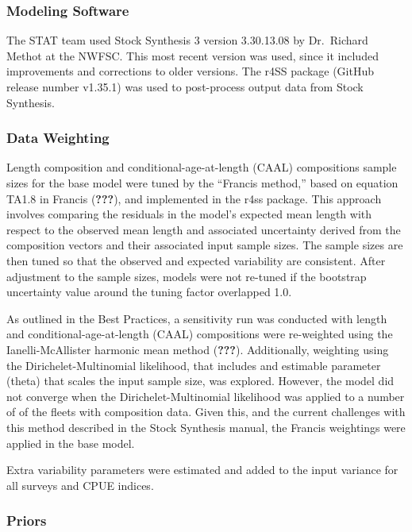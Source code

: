 \documentclass[12pt,]{article}
\begin{document}
\subsubsection{Modeling Software}\label{modeling-software}

The STAT team used Stock Synthesis 3 version 3.30.13.08 by Dr.~Richard
Methot at the NWFSC. This most recent version was used, since it
included improvements and corrections to older versions. The r4SS
package (GitHub release number v1.35.1) was used to post-process output
data from Stock Synthesis.

\subsubsection{Data Weighting}\label{data-weighting}

Length composition and conditional-age-at-length (CAAL) compositions
sample sizes for the base model were tuned by the ``Francis method,''
based on equation TA1.8 in Francis ({\textbf{???}}), and implemented in
the r4ss package. This approach involves comparing the residuals in the
model's expected mean length with respect to the observed mean length
and associated uncertainty derived from the composition vectors and
their associated input sample sizes. The sample sizes are then tuned so
that the observed and expected variability are consistent. After
adjustment to the sample sizes, models were not re-tuned if the
bootstrap uncertainty value around the tuning factor overlapped 1.0.

As outlined in the Best Practices, a sensitivity run was conducted with
length and conditional-age-at-length (CAAL) compositions were
re-weighted using the Ianelli-McAllister harmonic mean method
({\textbf{???}}). Additionally, weighting using the
Dirichelet-Multinomial likelihood, that includes and estimable parameter
(theta) that scales the input sample size, was explored. However, the
model did not converge when the Dirichelet-Multinomial likelihood was
applied to a number of of the fleets with composition data. Given this,
and the current challenges with this method described in the Stock
Synthesis manual, the Francis weightings were applied in the base model.

Extra variability parameters were estimated and added to the input
variance for all surveys and CPUE indices.

\subsubsection{Priors}\label{priors}
\end{document}
